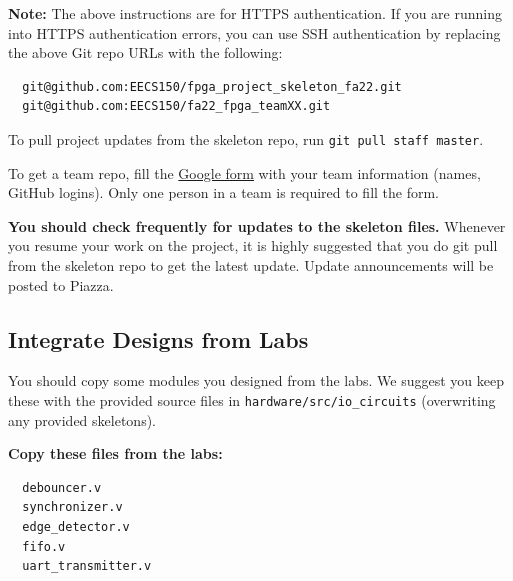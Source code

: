 \documentclass[11pt]{article}
\begin{document}
\textbf{Note:} The above instructions are for HTTPS authentication. If you are running into HTTPS authentication errors, you can use SSH authentication by replacing the above Git repo URLs with the following:

\begin{verbatim}
  git@github.com:EECS150/fpga_project_skeleton_fa22.git
  git@github.com:EECS150/fa22_fpga_teamXX.git
\end{verbatim}

To pull project updates from the skeleton repo, run \verb|git pull staff master|.

To get a team repo, fill the \href{https://forms.gle/7s9dDKWdLRchwKKd9}{Google form} with your team information (names, GitHub logins). Only one person in a team is required to fill the form.

\textbf{You should check frequently for updates to the skeleton files.} Whenever you resume your work on the project,
it is highly suggested that you do git pull from the skeleton repo to get the latest update.
Update announcements will be posted to Piazza.

\subsection{Integrate Designs from Labs} \label{sec:past_designs}
You should copy some modules you designed from the labs.
We suggest you keep these with the provided source files in \verb|hardware/src/io_circuits| (overwriting any provided skeletons).

\textbf{Copy these files from the labs:}
\begin{verbatim}
  debouncer.v
  synchronizer.v
  edge_detector.v
  fifo.v
  uart_transmitter.v
\end{verbatim}
\end{document}
